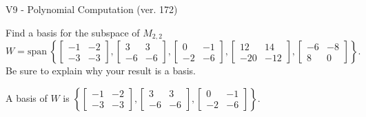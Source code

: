 \begin{exercise}
  \begin{exerciseTitle}V9 - Polynomial Computation (ver. 172)\end{exerciseTitle}
  \begin{exerciseStatement}
    Find a basis for the subspace of \(M_{2,2}\) 
\[W=\mathrm{span}\ \left\{\left[\begin{array}{cc}
-1 & -2 \\
-3 & -3
\end{array}\right] , \left[\begin{array}{cc}
3 & 3 \\
-6 & -6
\end{array}\right] , \left[\begin{array}{cc}
0 & -1 \\
-2 & -6
\end{array}\right] , \left[\begin{array}{cc}
12 & 14 \\
-20 & -12
\end{array}\right] , \left[\begin{array}{cc}
-6 & -8 \\
8 & 0
\end{array}\right]\right\}.\]
 Be sure to explain why your result is a basis.


  \end{exerciseStatement}
  \begin{exerciseAnswer}
   A basis of \(W\) is  \(\left\{\left[\begin{array}{cc}
-1 & -2 \\
-3 & -3
\end{array}\right] , \left[\begin{array}{cc}
3 & 3 \\
-6 & -6
\end{array}\right] , \left[\begin{array}{cc}
0 & -1 \\
-2 & -6
\end{array}\right]\right\}\).
  


  \end{exerciseAnswer}
\end{exercise}